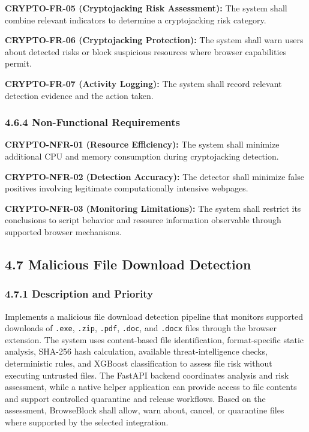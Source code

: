 \documentclass[12pt,a4paper]{report}
\let\originaladdcontentsline\addcontentsline
\renewcommand{\addcontentsline}[3]{\phantomsection\originaladdcontentsline{#1}{#2}{#3}}
\begin{document}
\textbf{CRYPTO-FR-05 (Cryptojacking Risk Assessment):} The system shall combine relevant indicators to determine a cryptojacking risk category.\par

\textbf{CRYPTO-FR-06 (Cryptojacking Protection):} The system shall warn users about detected risks or block suspicious resources where browser capabilities permit.\par

\textbf{CRYPTO-FR-07 (Activity Logging):} The system shall record relevant detection evidence and the action taken.\par

\subsubsection*{4.6.4 Non-Functional Requirements}

\textbf{CRYPTO-NFR-01 (Resource Efficiency):} The system shall minimize additional CPU and memory consumption during cryptojacking detection.\par

\textbf{CRYPTO-NFR-02 (Detection Accuracy):} The detector shall minimize false positives involving legitimate computationally intensive webpages.\par

\textbf{CRYPTO-NFR-03 (Monitoring Limitations):} The system shall restrict its conclusions to script behavior and resource information observable through supported browser mechanisms.\par

\subsection*{4.7 Malicious File Download Detection}

\subsubsection*{4.7.1 Description and Priority}

Implements a malicious file download detection pipeline that monitors supported downloads of \texttt{.exe}, \texttt{.zip}, \texttt{.pdf}, \texttt{.doc}, and \texttt{.docx} files through the browser extension. The system uses content-based file identification, format-specific static analysis, SHA-256 hash calculation, available threat-intelligence checks, deterministic rules, and XGBoost classification to assess file risk without executing untrusted files. The FastAPI backend coordinates analysis and risk assessment, while a native helper application can provide access to file contents and support controlled quarantine and release workflows. Based on the assessment, BrowseBlock shall allow, warn about, cancel, or quarantine files where supported by the selected integration.\par
\end{document}
